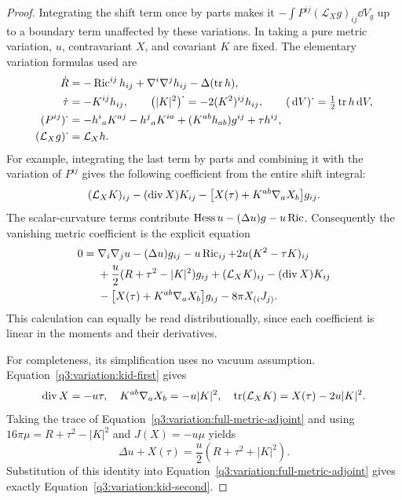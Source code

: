 \begin{proof}
Integrating the shift term once by parts makes it
$-\int P^{ij}(\mathcal L_Xg)_{ij}\dd V_g$ up to a boundary term
unaffected by these variations.  In taking a pure metric variation,
$u$, contravariant $X$, and covariant $K$ are fixed.  The elementary
variation formulas used are
\begin{align*}
 \dot R&=-\operatorname{Ric}^{ij}h_{ij}
             +\nabla^i\nabla^jh_{ij}-\Delta(\operatorname{tr} h),\\
 \dot\tau&=-K^{ij}h_{ij},\qquad
 \bigl(|K|^2\bigr)^{\boldsymbol\cdot}
       =-2(K^2)^{ij}h_{ij},\qquad
 (\,\mathrm d V)^{\boldsymbol\cdot}=\tfrac12\operatorname{tr} h\,\mathrm d V,\\
 (P^{ij})^{\boldsymbol\cdot}
       &=-h^i{}_aK^{aj}-h^j{}_aK^{ia}
                +(K^{ab}h_{ab})g^{ij}+\tau h^{ij},\\
 (\mathcal L_Xg)^{\boldsymbol\cdot}&=\mathcal L_Xh.
\end{align*}
For example, integrating the last term by parts and combining it
with the variation of $P^{ij}$ gives the following coefficient from
the entire shift integral:
\[
 (\mathcal L_XK)_{ij}-(\operatorname{div} X)K_{ij}
       -\bigl[X(\tau)+K^{ab}\nabla_aX_b\bigr]g_{ij}.
\]
The scalar-curvature terms contribute
$\operatorname{Hess} u-(\Delta u)g-u\operatorname{Ric}$.  Consequently the vanishing metric
coefficient is the explicit equation
\begin{equation}
 \begin{split}
 0={}&\nabla_i\nabla_j u-(\Delta u)g_{ij}-u\operatorname{Ric}_{ij}
       +2u(K^2-\tau K)_{ij}\\
   &+\frac u2(R+\tau^2-|K|^2)g_{ij}
       +(\mathcal L_XK)_{ij}-(\operatorname{div} X)K_{ij}\\
   &-\bigl[X(\tau)+K^{ab}\nabla_aX_b\bigr]g_{ij}
       -8\pi X_{(i}J_{j)}.
 \end{split}
 \label{q3:variation:full-metric-adjoint}
\end{equation}
This calculation can equally be read distributionally, since each
coefficient is linear in the moments and their derivatives.

For completeness, its simplification uses no vacuum assumption.
Equation~\eqref{q3:variation:kid-first} gives
\[
 \operatorname{div} X=-u\tau,\quad
 K^{ab}\nabla_aX_b=-u|K|^2,\quad
 \operatorname{tr}(\mathcal L_XK)=X(\tau)-2u|K|^2.
\]
Taking the trace of Equation~\eqref{q3:variation:full-metric-adjoint}
and using
$16\pi\mu=R+\tau^2-|K|^2$ and $J(X)=-u\mu$ yields
\begin{equation}
 \Delta u+X(\tau)=\frac u2(R+\tau^2+|K|^2).
 \label{q3:variation:trace-metric-equation}
\end{equation}
Substitution of this identity into
Equation~\eqref{q3:variation:full-metric-adjoint} gives exactly
Equation~\eqref{q3:variation:kid-second}.


\end{proof}
